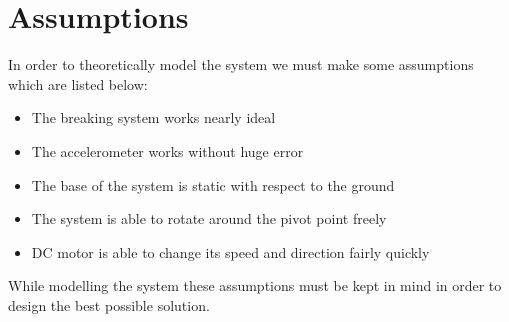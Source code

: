 \section{Assumptions}
In order to theoretically model the system we must make some assumptions which are listed below:
\begin{itemize}
 \item The breaking system works nearly ideal
 \item The accelerometer works without huge error 
 \item The base of the system is static with respect to the ground
 \item The system is able to rotate around the pivot point freely 
 \item DC motor is able to change its speed and direction fairly quickly
\end{itemize}
While modelling the system these assumptions must be kept in mind in order to design the best possible solution.

